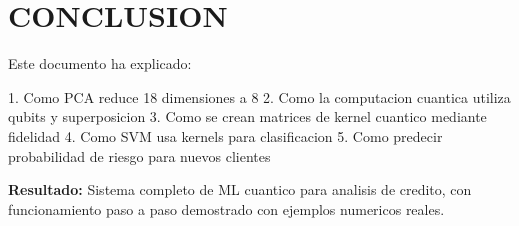 \documentclass[11pt]{article}
\begin{document}
\section*{CONCLUSION}

Este documento ha explicado:

1. Como PCA reduce 18 dimensiones a 8
2. Como la computacion cuantica utiliza qubits y superposicion
3. Como se crean matrices de kernel cuantico mediante fidelidad
4. Como SVM usa kernels para clasificacion
5. Como predecir probabilidad de riesgo para nuevos clientes

\textbf{Resultado:} Sistema completo de ML cuantico para analisis de credito, con funcionamiento paso a paso demostrado con ejemplos numericos reales.
\end{document}
